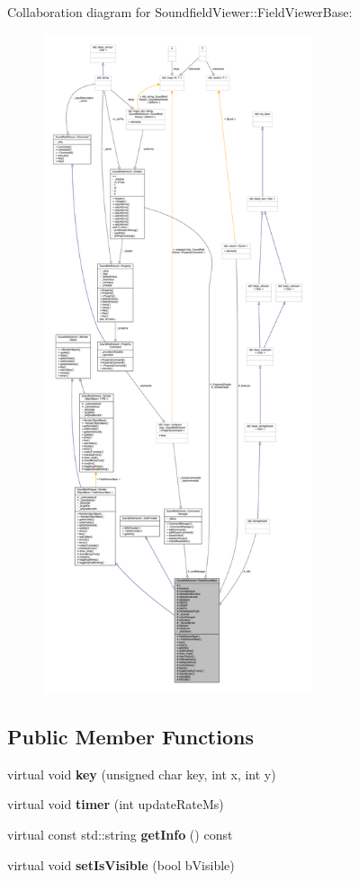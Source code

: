 Collaboration diagram for Soundfield\-Viewer\-:\-:Field\-Viewer\-Base\-:\nopagebreak
\begin{figure}[H]
\begin{center}
\leavevmode
\includegraphics[height=550pt]{dd/d6c/classSoundfieldViewer_1_1FieldViewerBase__coll__graph}
\end{center}
\end{figure}
\subsection*{Public Member Functions}
\begin{DoxyCompactItemize}
\item 
virtual void {\bfseries key} (unsigned char key, int x, int y)\label{classSoundfieldViewer_1_1FieldViewerBase_a2e6f2423856de9c7850bbabcf948ec34}

\item 
virtual void {\bfseries timer} (int update\-Rate\-Ms)\label{classSoundfieldViewer_1_1FieldViewerBase_aaca7b68a0ac76d94cf4a0e0f28413886}

\item 
virtual const std\-::string {\bfseries get\-Info} () const \label{classSoundfieldViewer_1_1FieldViewerBase_a2b62ea8b571181958e7e9a6d4860f575}

\item 
virtual void {\bfseries set\-Is\-Visible} (bool b\-Visible)\label{classSoundfieldViewer_1_1FieldViewerBase_ab50c583c393a3513a1fce41f0125e2c1}

\end{DoxyCompactItemize}
